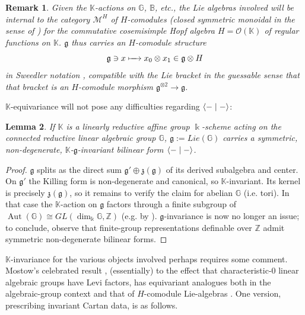 \documentclass[11pt,leqno]{article}
\theoremstyle{plain}
\newtheorem{lemma}{Lemma}[section]
\theoremstyle{plain}
\theoremstyle{plain}
\newtheorem{remark}[lemma]{Remark}
\numberwithin{equation}{section}
\theoremstyle{nonumberplain}
\newtheorem{proof}{Proof}
\newcommand\bB{{\mathbb B}}
\newcommand\bG{{\mathbb G}}
\newcommand\bK{{\mathbb K}}
\newcommand\bZ{{\mathbb Z}}
\newcommand\cM{{\mathcal M}}
\newcommand\cO{{\mathcal O}}
\newcommand\fg{{\mathfrak g}}
\newcommand\fz{{\mathfrak z}}
\newcommand\1{{\bf 1}}
\DeclareMathOperator{\Aut}{\mathrm{Aut}}
\begin{document}
\begin{remark}\label{re:comods}
  Given the $\bK$-actions on $\bG$, $\bB$, etc., the Lie algebras involved will be internal to the category $\cM^H$ of $H$-comodules (\emph{closed symmetric monoidal} in the sense of \cite[Definition 6.1.3]{brcx_hndbk-2}) for the commutative \emph{cosemisimple} \cite[post Theorem 3.1.5]{dnr} Hopf algebra $H=\cO(\bK)$ of regular functions on $\bK$. $\fg$ thus carries an $H$-comodule structure
    \begin{equation*}
      \fg\ni x
      \xmapsto{\quad}
      x_0\otimes x_1\in \fg\otimes H
    \end{equation*}
    in \emph{Sweedler notation} \cite[\S 1.1.8]{dnr}, compatible with the Lie bracket in the guessable sense that that bracket is an $H$-comodule morphism $\fg^{\otimes 2}\to \fg$.
\end{remark}

$\bK$-equivariance will not pose any difficulties regarding $\Braket{-\mid -}$:

\begin{lemma}\label{le:exists.inv.bracket}
  If $\bK$ is a linearly reductive affine group $\Bbbk$-scheme acting on the connected reductive linear algebraic group $\bG$, $\fg:=Lie(\bG)$ carries a symmetric, non-degenerate, $\bK$-$\fg$-invariant bilinear form $\Braket{-\mid -}$. 
\end{lemma}
\begin{proof}
  $\fg$ splits \cite[\S 19.1, Proposition (a)]{hmph_1972} as the direct sum $\fg'\oplus \fz(\fg)$ of its derived subalgebra and center. On $\fg'$ the Killing form is non-degenerate and canonical, so $\bK$-invariant. Its kernel is precisely $\fz(\fg)$, so it remains to verify the claim for abelian $\bG$ (i.e. tori). In that case the $\bK$-action on $\fg$ factors through a finite subgroup of $\Aut(\bG)\cong GL\left(\dim_{\Bbbk} \bG,\bZ\right)$ (e.g. by \cite[Corollary III.8.3]{brl}). $\fg$-invariance is now no longer an issue; to conclude, observe that finite-group representations definable over $\bZ$ admit symmetric non-degenerate bilinear forms.
\end{proof}

$\bK$-invariance for the various objects involved perhaps requires some comment. Mostow's celebrated result \cite[first two Theorems, pp.200-201]{MR92928}, (essentially) to the effect that characteristic-0 linear algebraic groups have Levi factors, has equivariant analogues both in the algebraic-group context \cite[Proposition 6.1]{MR651417} and that of $H$-comodule Lie-algebras \cite[Theorem 7.4]{MR3115171}. One version, prescribing invariant Cartan data, is as follows. 
\end{document}
